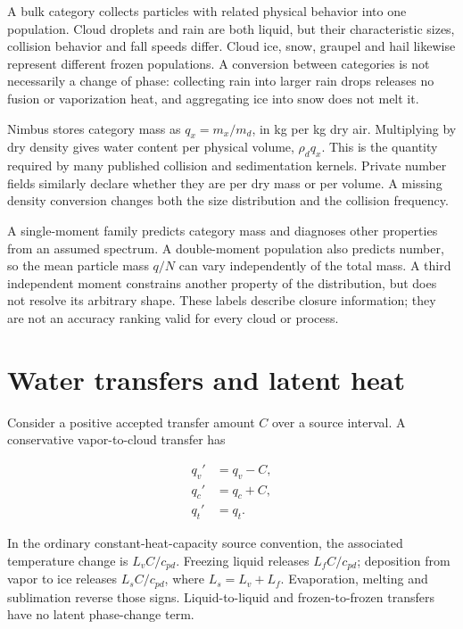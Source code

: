 \documentclass[
  11pt,
]{report}
\begin{document}
A bulk category collects particles with related physical behavior into
one population. Cloud droplets and rain are both liquid, but their
characteristic sizes, collision behavior and fall speeds differ. Cloud
ice, snow, graupel and hail likewise represent different frozen
populations. A conversion between categories is not necessarily a change
of phase: collecting rain into larger rain drops releases no fusion or
vaporization heat, and aggregating ice into snow does not melt it.

Nimbus stores category mass as \(q_x=m_x/m_d\), in kg per kg dry air.
Multiplying by dry density gives water content per physical volume,
\(\rho_d q_x\). This is the quantity required by many published
collision and sedimentation kernels. Private number fields similarly
declare whether they are per dry mass or per volume. A missing density
conversion changes both the size distribution and the collision
frequency.

A single-moment family predicts category mass and diagnoses other
properties from an assumed spectrum. A double-moment population also
predicts number, so the mean particle mass \(q/N\) can vary
independently of the total mass. A third independent moment constrains
another property of the distribution, but does not resolve its arbitrary
shape. These labels describe closure information; they are not an
accuracy ranking valid for every cloud or process.

\section{Water transfers and latent
heat}\label{water-transfers-and-latent-heat}

Consider a positive accepted transfer amount \(C\) over a source
interval. A conservative vapor-to-cloud transfer has

\[\begin{aligned}
q_v' &= q_v-C, \\
q_c' &= q_c+C, \\
q_t' &= q_t.
\end{aligned}\]

In the ordinary constant-heat-capacity source convention, the associated
temperature change is \(L_v C/c_{pd}\). Freezing liquid releases
\(L_f C/c_{pd}\); deposition from vapor to ice releases
\(L_s C/c_{pd}\), where \(L_s=L_v+L_f\). Evaporation, melting and
sublimation reverse those signs. Liquid-to-liquid and frozen-to-frozen
transfers have no latent phase-change term.
\end{document}
